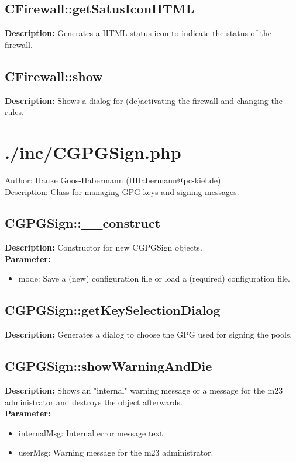 \subsection{CFirewall::getSatusIconHTML}
\textbf{Description:} Generates a HTML status icon to indicate the status of the firewall.\\

\subsection{CFirewall::show}
\textbf{Description:} Shows a dialog for (de)activating the firewall and changing the rules.\\

\newpage\section{./inc/CGPGSign.php}
 Author: Hauke Goos-Habermann (HHabermann@pc-kiel.de)\\
 Description: Class for managing GPG keys and signing messages.\\

\subsection{CGPGSign::\_\_construct}
\textbf{Description:} Constructor for new CGPGSign objects.\\
\textbf{Parameter:}
\begin{itemize}
\item mode: Save a (new) configuration file or load a (required) configuration file.
\end{itemize}

\subsection{CGPGSign::getKeySelectionDialog}
\textbf{Description:} Generates a dialog to choose the GPG used for signing the pools.\\

\subsection{CGPGSign::showWarningAndDie}
\textbf{Description:} Shows an "internal" warning message or a message for the m23 administrator and destroys the object afterwards.\\
\textbf{Parameter:}
\begin{itemize}
\item internalMsg: Internal error message text.
\item userMsg: Warning message for the m23 administrator.
\end{itemize}

